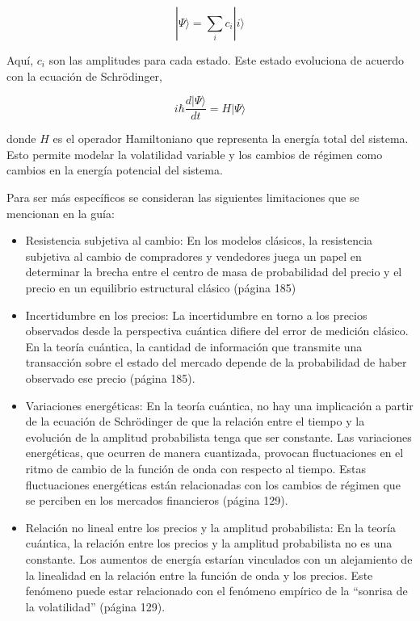 \begin{problema}
\begin{sol}
\begin{enumerate}
\begin{equation*}
|\Psi\rangle = \sum_i c_i |i\rangle
\end{equation*}

Aquí, $c_i$ son las amplitudes para cada estado. Este estado evoluciona de acuerdo con la ecuación de Schrödinger,

\begin{equation*}
i\hbar \frac{d|\Psi\rangle}{dt} = H|\Psi\rangle
\end{equation*}

donde $H$ es el operador Hamiltoniano que representa la energía total del sistema. Esto permite modelar la volatilidad variable y los cambios de régimen como cambios en la energía potencial del sistema.


Para ser más específicos se consideran las siguientes limitaciones que se mencionan en la guía: 
\begin{itemize}
    \item Resistencia subjetiva al cambio: En los modelos clásicos, la resistencia subjetiva al cambio de compradores y vendedores juega un papel en determinar la brecha entre el centro de masa de probabilidad del precio y el precio en un equilibrio estructural clásico (página 185)
    \item Incertidumbre en los precios: La incertidumbre en torno a los precios observados desde la perspectiva cuántica difiere del error de medición clásico. En la teoría cuántica, la cantidad de información que transmite una transacción sobre el estado del mercado depende de la probabilidad de haber observado ese precio (página 185).
    \item Variaciones energéticas: En la teoría cuántica, no hay una implicación a partir de la ecuación de Schrödinger de que la relación entre el tiempo y la evolución de la amplitud probabilista tenga que ser constante. Las variaciones energéticas, que ocurren de manera cuantizada, provocan fluctuaciones en el ritmo de cambio de la función de onda con respecto al tiempo. Estas fluctuaciones energéticas están relacionadas con los cambios de régimen que se perciben en los mercados financieros (página 129).
    \item Relación no lineal entre los precios y la amplitud probabilista: En la teoría cuántica, la relación entre los precios y la amplitud probabilista no es una constante. Los aumentos de energía estarían vinculados con un alejamiento de la linealidad en la relación entre la función de onda y los precios. Este fenómeno puede estar relacionado con el fenómeno empírico de la “sonrisa de la volatilidad” (página 129).
\end{itemize}
    

\end{enumerate}
\end{sol}
\end{problema}
